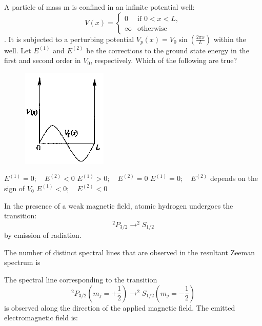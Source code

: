 \documentclass{exam}
\begin{document}
\begin{questions}
\question A particle of mass m is confined in an infinite potential well: $$V(x) = \begin{cases} 0 & \text{if } 0<x<L, \\ \infty & \text{otherwise} \end{cases}$$. It is subjected to a perturbing potential $V_p(x) = V_0 \sin\left(\frac{2\pi x}{L}\right)$ within the well. Let $E^{(1)}$ and $E^{(2)}$ be the corrections to the ground state energy in the first and second order in $V_0$, respectively. Which of the following are true?\hfill{}
	\begin{figure}[H] \centering
		\caption*{} \label{47} \includegraphics[width=0.4\columnwidth]{pics/47.png}
	\end{figure}


\begin{choices}
	\begin{multicols}{2}
	 \choice $E^{(1)}=0; \quad E^{(2)}<0$ \choice $E^{(1)}>0; \quad E^{(2)}=0$
	\choice $E^{(1)}=0; \quad E^{(2)}$ depends on the sign of $V_0$ \choice $E^{(1)}<0; \quad E^{(2)}<0$
	\end{multicols}
\end{choices}

\par\noindent In the presence of a weak magnetic field, atomic hydrogen undergoes the transition:
\[ ^2P_{3/2} \rightarrow ^2S_{1/2} \]
by emission of radiation.

\question The number of distinct spectral lines that are observed in the resultant Zeeman spectrum is\par\hfill{}

\begin{oneparchoices}
	   
\end{oneparchoices}

\question The spectral line corresponding to the transition $$^2P_{3/2} \left(m_j = +\frac{1}{2}\right) \rightarrow ^2S_{1/2} \left(m_j = -\frac{1}{2}\right)$$ is observed along the direction of the applied magnetic field. The emitted electromagnetic field is:\hfill{}


\end{questions}
\end{document}
